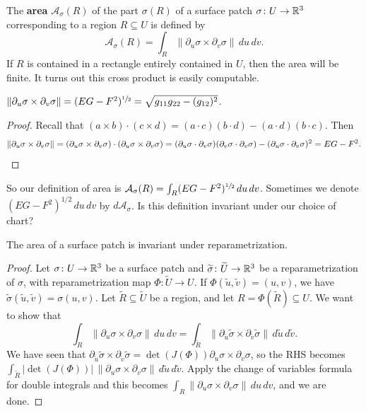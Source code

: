 \begin{definition}[]
    The \textbf{area} $\mathcal{A}_{\sigma} (R)$ of the part $\sigma(R)$ of a surface patch $\sigma \colon U \to \mathbb{R}^3$ corresponding to a region $R \subseteq U$ is defined by \[
        \mathcal{A} _{\sigma}(R)=\int_{R}^{} \|\partial _u\sigma \times \partial _v\sigma\| \, du\,dv.
    \] If $R$ is contained in a rectangle entirely contained in $U$, then the area will be finite. It turns out this cross product is easily computable.
\end{definition}
\begin{prop}
    $\|\partial _u\sigma \times \partial _v\sigma\|=(EG-F^2)^{\sfrac{1}{2}}=\sqrt{g_{11}g_{22}-(g_{12})^2}$.
\end{prop}
\begin{proof}
    Recall that $(a\times b)\cdot (c\times d)=(a\cdot c)(b\cdot d)-(a\cdot d)(b\cdot c)$. Then \[
        \|\partial _u\sigma \times \partial _v\sigma\|=(\partial _u\sigma \times \partial _v\sigma)\cdot (\partial _u\sigma \times \partial _v\sigma)=(\partial _u\sigma \cdot \partial _v\sigma)(\partial _v\sigma\cdot \partial _v\sigma)-(\partial _u\sigma\cdot \partial _v\sigma)^2=EG-F^2.\qedhere
    \] 
\end{proof}
So our definition of area is $\mathcal{A} _{\sigma}(R)=\int_{R}^{ } (EG-F^2)^{\sfrac{1}{2}}  \, du\,dv$. Sometimes we denote $(EG-F^2)^{1 /2}\,du\,dv$ by $d\mathcal{A} _{\sigma}$. Is this definition invariant under our choice of chart?
\begin{prop}
    The area of a surface patch is invariant under reparametrization.
\end{prop}
\begin{proof}
    Let $\sigma \colon U \to \mathbb{R}^3$ be a surface patch and $\widetilde \sigma \colon \widetilde U \to \mathbb{R}^3$ be a reparametrization of $\sigma$, with reparametrization map $\Phi \colon \widetilde U \to U$. If $\Phi(\widetilde u,\widetilde v)=(u,v)$, we have $\widetilde \sigma(\widetilde u,\widetilde v)=\sigma(u,v)$. Let $\widetilde R\subseteq \widetilde U$ be a region, and let $R=\Phi(\widetilde R)\subseteq U$. We want to show that \[
    \int_{R}^{} \|\partial _u\sigma \times \partial _v\sigma\| \, du\,dv = \int _{\widetilde R}\|\partial _{\widetilde u}\widetilde \sigma \times \partial _{\widetilde v}\widetilde \sigma \| \, d\widetilde u\, d\widetilde v.
\] We have seen that $\partial _{\widetilde u}\widetilde \sigma \times \partial _{\widetilde v}\widetilde \sigma=\det (J(\Phi))\partial _u\sigma \times \partial _v\sigma$, so the RHS becomes $\int _{\widetilde R}|\det (J(\Phi))|\, \|\partial _u\sigma \times \partial _v\sigma\| \, d\widetilde u\,d\widetilde v$. Apply the change of variables formula for double integrals and this becomes $\int _R \|\partial _u\sigma \times \partial _v\sigma\| \, du\, dv$, and we are done.
\end{proof}

